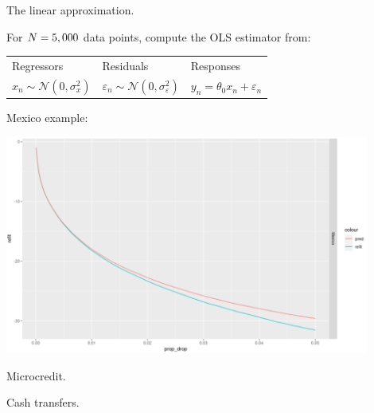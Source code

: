 

\begin{frame}{The linear approximation.}

For $N=5,000$ data points, compute the OLS estimator from:

\vspace{1em}
\begin{tabularx}{\textwidth}{YYY}
    Regressors  &   Residuals   &   Responses \\
    $x_n \sim \mathcal{N}(0, \sigma_x^2)$   &
    $\varepsilon_n \sim \mathcal{N}(0, \sigma_\varepsilon^2)$   &
    $y_n = \theta_0 x_n + \varepsilon_n$
\end{tabularx}
%

\SimApproxNormalGraph{}

\end{frame}




\begin{frame}

Mexico example:

\includegraphics[width=0.9\textwidth]{static_figures/mx_refit_example}

\end{frame}






\begin{frame}{Microcredit.}

{
\footnotesize
\MicrocreditProfitResultsTable{}
}

\end{frame}



\begin{frame}{Cash transfers.}

{
\footnotesize
\CashTransfersResultsTable{}
}

\end{frame}
